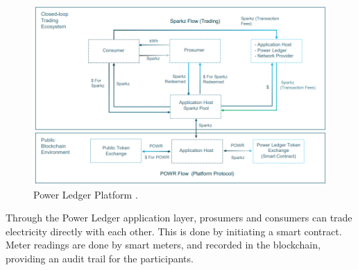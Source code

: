 \begin{figure}[htb]
    \centering
    \includegraphics[width=1\textwidth]{Images/pl}
    \caption{Power Ledger Platform \cite{pl_home}.}
    \label{fig:pl}
\end{figure}

Through the Power Ledger application layer, prosumers and consumers can trade electricity directly with each other. This is done by initiating a smart contract. Meter readings are done by smart meters, and recorded in the blockchain, providing an audit trail for the participants. 

